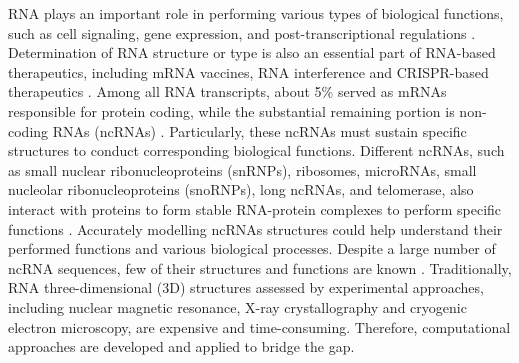 





\forceindent RNA plays an important role in performing various types of biological functions, such as cell signaling, gene expression, and post-transcriptional regulations \cite{miao2017rna,caprara2000rna,atkins2011rna}. Determination of RNA structure or type is also an essential part of RNA-based therapeutics, including mRNA vaccines, RNA interference and CRISPR-based therapeutics \cite{li2020strategies, bora2012rna, pardi2018mrna}. Among all RNA transcripts, about 5\% served as mRNAs responsible for protein coding, while the substantial remaining portion is non-coding RNAs (ncRNAs) \cite{ chen2019computational, wang2011molecular}. Particularly, these ncRNAs must sustain specific structures to conduct corresponding biological functions. Different ncRNAs, such as small nuclear ribonucleoproteins (snRNPs), ribosomes, microRNAs, small nucleolar ribonucleoproteins (snoRNPs), long ncRNAs, and telomerase, also interact with
proteins to form stable RNA-protein complexes to perform specific functions \citep{cech2014noncoding, miao2017rna}.
Accurately modelling ncRNAs structures could help understand their performed functions and various biological processes. Despite a large number of ncRNA sequences, few of their structures and functions are known \citep{townshend2021geometric,yao2019cellular}. Traditionally, RNA three-dimensional (3D) structures assessed by experimental approaches, including nuclear magnetic resonance, X-ray crystallography and cryogenic electron microscopy, are expensive and time-consuming. Therefore, computational approaches are developed and applied to bridge the gap.


